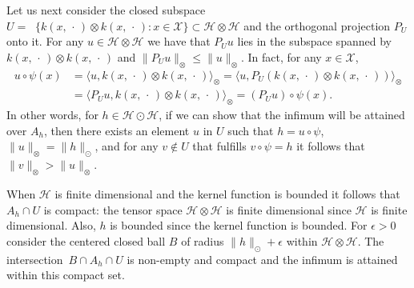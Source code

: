 \documentclass[10pt]{amsart}
\theoremstyle{definition}\newtheorem{defi}[theo]{Definition}\newtheorem{rema}[theo]{Remark}\newtheorem{exam}[theo]{Example}\newtheorem{exem}[theo]{Example}\newtheorem{nota}[theo]{Notation}
\theoremstyle{remark}
\DeclareMathOperator{\cspn}{\overline{span}}
\newcommand{\X}{\mathcal{X}}
\newcommand{\cH}{\mathcal{H}}
\begin{document}
Let us next consider the closed subspace $U = \cspn \{ k(x,\,\cdot\,) \otimes k(x,\,\cdot\,) : x \in \X\} \subset \cH \otimes \cH$ and the orthogonal projection $P_U$ onto it. For any $u \in \cH \otimes \cH$ we have that $P_U u $ lies in the subspace spanned by $k(x,\,\cdot\,) \otimes k(x,\,\cdot\,)$ and $\|P_U u\|_\otimes \leq \|u\|_\otimes$. In fact, for any $x \in \X$,
\begin{align*}
u \circ \psi(x) &= \langle u, k(x,\,\cdot\,) \otimes k(x,\,\cdot\,) \rangle_\otimes = \langle u, P_U(k(x,\,\cdot\,) \otimes k(x,\,\cdot\,)) \rangle_\otimes \\
&= \langle P_U u, k(x,\,\cdot\,) \otimes k(x,\,\cdot\,) \rangle_\otimes = (P_U u) \circ \psi(x).
\end{align*}
In other words, for $h \in \cH \odot \cH$, if we can show that the infimum will be attained over $A_h$, then there exists an element $u$ in $U$ such that $h =u \circ \psi$, $\|u\|_\otimes = \|h\|_\odot$, and for any $v \not \in U$ that fulfills $v \circ \psi = h$ it follows that $\|v\|_\otimes > \|u\|_\otimes$.

When $\cH$ is finite dimensional and the kernel function is bounded it follows that $A_h \cap U$ is compact: the tensor space $\cH \otimes \cH$ is finite dimensional since $\cH$ is finite dimensional. Also, $h$ is bounded since the kernel function is bounded. For $\epsilon>0$ consider the centered closed ball $B$ of radius $\|h\|_\odot + \epsilon$ within $\cH \otimes \cH$. The intersection~$B\cap A_h \cap U$ is non-empty and compact and the infimum is attained within this compact set.
\end{document}
